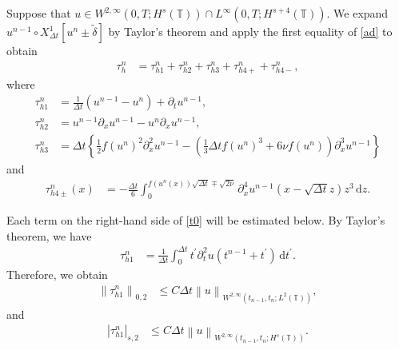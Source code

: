 \documentclass[10pt,a4paper,tbtags,leqno]{amsart}
\theoremstyle{definition}
\numberwithin{equation}{section}
\def\norm#1#2{\left\|#2\right\|_{#1}}
\def\snorm#1#2{\left|#2\right|_{#1}}
\begin{document}
Suppose that $ u \in W^{2,\infty} (0, T; H^{s} (\mathbb{T})) \cap L^{\infty} (0, T; H^{s + 4} (\mathbb{T})) $. 
We expand $ u^{n - 1} \circ {X_{\Delta t}^1} [u^n \pm \tilde{\delta}] $ by Taylor's theorem and apply the first equality of \eqref{ad} to obtain 
\begin{align} 
  \tau_h^n & = \tau_{h1}^n + \tau_{h2}^n + \tau_{h3}^n + \tau_{h4+}^n + \tau_{h4-}^n, \label{t0}
\end{align} 
where 
\begin{align}
  \tau_{h1}^n & = \frac{1}{\Delta t} \left( u^{n - 1} - u^n \right) + \partial_t u^{n - 1}, \\
  \tau_{h2}^n & = u^{n - 1} \partial_x u^{n - 1} - u^n \partial_x u^{n - 1}, \\
  \tau_{h3}^n & = \Delta t \left\{\frac12 f(u^n)^2 \partial_x^2 u^{n - 1} - \left(\frac13 \Delta t f (u^n)^3 + 6 \nu f (u^n) \right) \partial_x^3 u^{n - 1}\right\} 
\end{align}
and 
\begin{align}
  \tau_{h4\pm}^n (x) & = - \frac{\Delta t}{6} \int_0^{f (u^n (x)) \sqrt{\Delta t} \mp \sqrt{2 \nu}} \partial_x^4 u^{n - 1} (x - \sqrt{\Delta t} z) z^3 \, \mathrm{d}z. 
\end{align}

Each term on the right-hand side of \eqref{t0} will be estimated below. By Taylor's theorem, we have 
\begin{align} 
  \tau_{h1}^n & = \frac{1}{\Delta t} \int_{0}^{\Delta t} t^\prime \partial_t^2 u (t^{n - 1} + t^\prime) \, \mathrm{d} t^\prime. 
\end{align} 
Therefore, we obtain 
\begin{align}
  \norm{0, 2}{\tau_{h1}^n} & \leq C \Delta t \norm{W^{2, \infty}(t_{n - 1}, t_n; L^2 (\mathbb{T}))}{u}, \label{t10}
\end{align}
and 
\begin{align}
  \snorm{s, 2}{\tau_{h1}^n} & \leq C \Delta t \norm{W^{2, \infty}(t_{n - 1}, t_n; H^s (\mathbb{T}))}{u}. \label{t1s}
\end{align}
\end{document}
